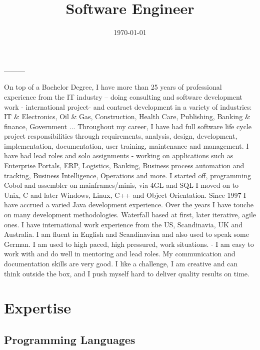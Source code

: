 \documentclass[11pt,a4paper,sans]{moderncv} %
\title{Software Engineer}
\begin{document}
\makecvtitle
\date{\today} %
\closing{---------}

On top of a Bachelor Degree, I have more than 25 years of professional
experience from the IT industry – doing consulting and software
development work - international project- and contract development in a
variety of industries: IT \& Electronics, Oil \& Gas, Construction, Health
Care, Publishing, Banking \& finance, Government ...
\newline{}
\newline{}
Throughout my career, I have had full software life cycle project
responsibilities through requirements, analysis, design, development,
implementation, documentation, user training, maintenance and
management. I have had lead roles and solo assignments - working on
applications such as  Enterprise Portals, ERP, Logistics, Banking,
Business process automation and tracking, Business Intelligence, Operations and
more.
\newline{}
\newline{}
I started off, programming Cobol and assembler on mainframes/minis, via
4GL and SQL I moved on to Unix, C and later Windows, Linux, C++ and Object
Orientation. Since 1997 I have accrued a varied Java development
experience. Over the years I have touche on many  development  methodologies. 
Waterfall based at first, later iterative, agile ones.  
I have international work experience from the
US, Scandinavia, UK and Australia. I am fluent in English and
Scandinavian and also used to speak some German.
\newline{}
\newline{}
I am used to high paced, high pressured, work situations.  - I am easy
to work with and do well in mentoring and lead roles. My communication
and documentation skills are very good.  I like a challenge, I am
creative and can think outside the box, and I push myself hard to
deliver quality results on time.

\makeletterclosing
\pagebreak

\section{Expertise}
\subsection{Programming Languages}
\end{document}
